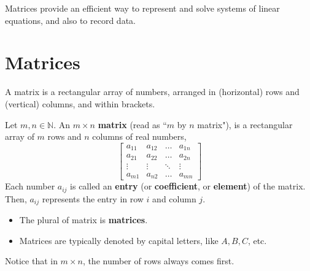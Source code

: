 \documentclass[letterpaper,12pt]{article}
\begin{document}
Matrices provide an efficient way to represent and solve systems of linear equations, and also to record data.

\section*{Matrices}
A matrix is a rectangular array of numbers, arranged in (horizontal) rows and (vertical) columns, and within brackets.

\begin{definition}
Let $m, n \in \mathbb{N}$. An $m \times n$ \textbf{matrix} (read as ``$m$ by $n$ matrix"), is a rectangular array of $m$ rows and $n$ columns of real numbers,
\begin{equation*}
    \begin{bmatrix}
    a_{11} & a_{12} & \dots & a_{1n} \\
    a_{21} & a_{22} & \dots & a_{2n} \\
    \vdots & \vdots & \ddots & \vdots \\
    a_{m1} & a_{n2} & \dots & a_{mn}
    \end{bmatrix}
\end{equation*}
Each number $a_{ij}$ is called an \textbf{entry} (or \textbf{coefficient}, or \textbf{element}) of the matrix. Then, $a_{ij}$ represents the entry in row $i$ and column $j$.
\begin{itemize}
    \item The plural of matrix is \textbf{matrices}.
    \item Matrices are typically denoted by capital letters, like $A, B, C$, etc.
\end{itemize}
\end{definition}

Notice that in $m \times n$, the number of rows always comes first.
\end{document}
